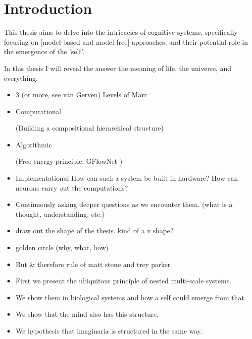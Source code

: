 \section{Introduction}
This thesis aims to delve into the intricacies of cognitive systems, specifically focusing on [model-based and model-free] approaches, and their potential role in the emergence of the 'self'.

In this thesis I will reveal the answer the meaning of life, the universe, and everything.

\begin{itemize}
    \item 3 (or more, see van Gerven) Levels of Marr
    \item Computational
    
    (Building a compositional hierarchical structure)
    \item Algorithmic 
    
(Free energy principle, GFlowNet )
    \item Implementational How can such a system be built in
    hardware? How can neurons carry out the
    computations?
    \item Continuously asking deeper questions as we encounter them. (what is a thought, understanding, etc.)
    \item draw out the shape of the thesis. kind of a v shape?
    \item golden circle (why, what, how)
    \item But \& therefore rule of matt stone and trey parker 
\end{itemize}




\begin{itemize}
    \item First we present the ubiquitous principle of nested multi-scale systems.
    \item We show them in biological systems and how a self could emerge from that. 
    \item We show that the mind also has this structure. 
    \item We hypothesis that imaginaria is structured in the same way. 
\end{itemize}

